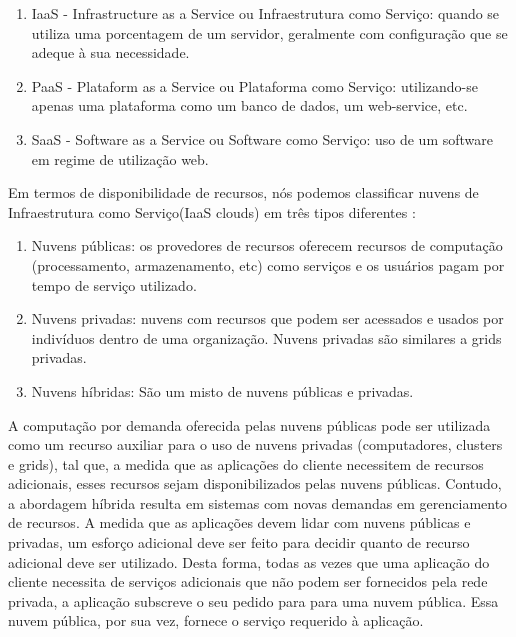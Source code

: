 \documentclass[a4paper,10pt]{article}
\begin{document}
\begin{enumerate}

    \item IaaS - Infrastructure as a Service ou Infraestrutura como Serviço: quando se utiliza uma porcentagem de um servidor, geralmente com configuração que se adeque à sua necessidade.

    \item PaaS - Plataform as a Service ou Plataforma como Serviço: utilizando-se apenas uma plataforma como um banco de dados, um web-service, etc.

    \item SaaS - Software as a Service ou Software como Serviço: uso de um software em regime de utilização web.

\end{enumerate}


Em termos de disponibilidade de recursos, nós podemos classificar nuvens de Infraestrutura como Serviço(IaaS clouds) em três 
tipos diferentes \cite{hcoc}:

\begin{enumerate}

  \item Nuvens públicas: os provedores de recursos oferecem recursos de computação (processamento, armazenamento, etc) como serviços e os usuários 
  pagam por tempo de serviço utilizado. 
  
  \item Nuvens privadas: nuvens com recursos que podem ser acessados e usados por indivíduos dentro de uma organização. Nuvens privadas são 
  similares a grids privadas.

  \item Nuvens híbridas: São um misto de nuvens públicas e privadas.

\end{enumerate}

A computação por demanda oferecida pelas nuvens públicas pode ser utilizada como um recurso auxiliar para o uso de nuvens privadas (computadores, clusters e grids), 
tal que, a medida que as aplicações do cliente necessitem de recursos adicionais, esses 
recursos sejam disponibilizados pelas nuvens públicas. Contudo, a abordagem híbrida resulta em sistemas com novas demandas em gerenciamento 
de recursos. A medida que as aplicações devem lidar com nuvens públicas e privadas, um esforço adicional deve ser feito para decidir quanto 
de recurso adicional deve ser utilizado. Desta forma, todas as vezes que uma aplicação do cliente necessita de serviços adicionais 
que não podem ser fornecidos pela rede privada, a aplicação subscreve o seu pedido para para uma nuvem pública. 
Essa nuvem pública, por sua vez, fornece o serviço requerido à aplicação.\\
\end{document}
